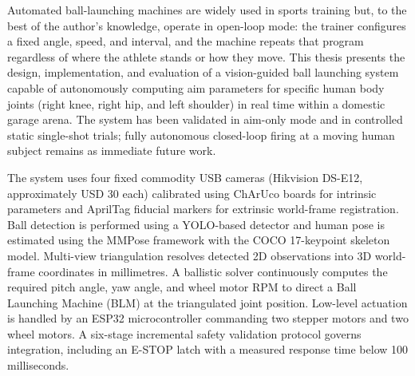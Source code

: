 
Automated ball-launching machines are widely used in sports training but, to the best of the author's knowledge, operate in open-loop mode: the trainer configures a fixed angle, speed, and interval, and the machine repeats that program regardless of where the athlete stands or how they move. This thesis presents the design, implementation, and evaluation of a vision-guided ball launching system capable of autonomously computing aim parameters for specific human body joints (right knee, right hip, and left shoulder) in real time within a domestic garage arena. The system has been validated in aim-only mode and in controlled static single-shot trials; fully autonomous closed-loop firing at a moving human subject remains as immediate future work.

The system uses four fixed commodity USB cameras (Hikvision DS-E12, approximately USD 30 each) calibrated using ChArUco boards for intrinsic parameters and AprilTag fiducial markers for extrinsic world-frame registration. Ball detection is performed using a YOLO-based detector and human pose is estimated using the MMPose framework with the COCO 17-keypoint skeleton model. Multi-view triangulation resolves detected 2D observations into 3D world-frame coordinates in millimetres. A ballistic solver continuously computes the required pitch angle, yaw angle, and wheel motor RPM to direct a Ball Launching Machine (BLM) at the triangulated joint position. Low-level actuation is handled by an ESP32 microcontroller commanding two stepper motors and two wheel motors. A six-stage incremental safety validation protocol governs integration, including an E-STOP latch with a measured response time below 100 milliseconds.
